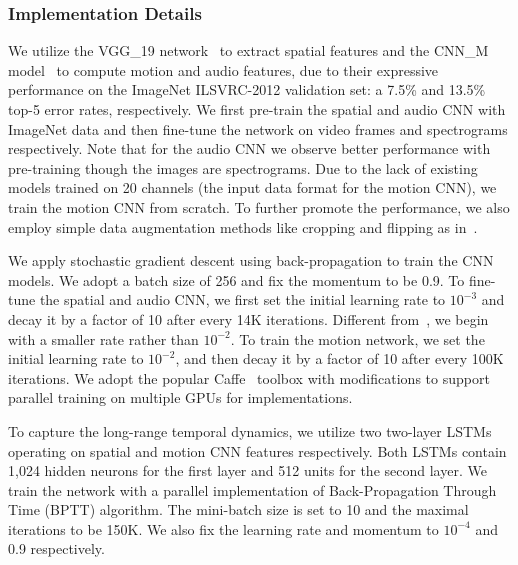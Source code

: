 \documentclass[journal]{IEEEtran}
\begin{document}
\subsubsection{Implementation Details}
We utilize the VGG\_19 network~\cite{Simonyan2015} to extract spatial features and the CNN\_M model~\cite{DBLP:conf/nips/SimonyanZ14} to compute motion and audio features, due to their expressive performance on the ImageNet ILSVRC-2012 validation set: a 7.5\% and 13.5\% top-5 error rates, respectively. We first pre-train the spatial and audio CNN with ImageNet data and then fine-tune the network on video frames and spectrograms respectively. Note that for the audio CNN we observe better performance with pre-training though the images are spectrograms. Due to the lack of existing models trained on 20 channels (the input data format for the motion CNN), we train the motion CNN from scratch. To further promote the performance, we also employ simple data augmentation methods like cropping and flipping as in~\cite{DBLP:conf/nips/SimonyanZ14}.

We apply stochastic gradient descent using back-propagation to train the CNN models. We adopt a batch size of 256 and fix the momentum to be 0.9. To fine-tune the spatial and audio CNN, we first set the initial learning rate to $10^{-3}$ and decay it by a factor of 10 after every 14K iterations. Different from~\cite{DBLP:conf/nips/SimonyanZ14}, we begin with a smaller rate rather than $10^{-2}$. To train the motion network, we set the initial learning rate to $10^{-2}$, and then decay it by a factor of 10 after every 100K iterations. We adopt the popular Caffe~\cite{jia2014caffe} toolbox with modifications to support parallel training on multiple GPUs for implementations.

To capture the long-range temporal dynamics, we utilize two two-layer LSTMs operating on spatial and motion CNN features respectively. Both LSTMs contain 1,024 hidden neurons for the first layer and 512 units for the second layer. We train the network with a parallel implementation of Back-Propagation Through Time (BPTT) algorithm. The mini-batch size is set to 10 and the maximal iterations to be 150K. We also fix the learning rate and momentum to $10^{-4}$ and 0.9 respectively.

\end{document}
